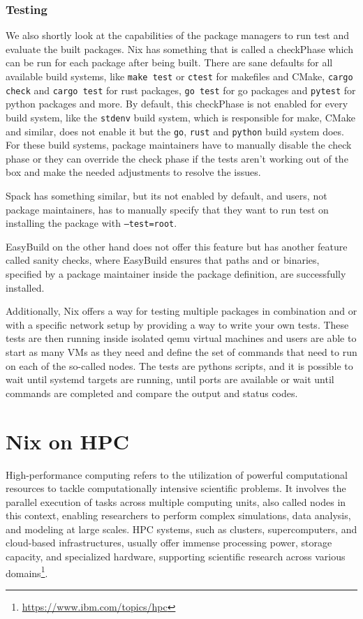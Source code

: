 \documentclass[conference,final,a4paper]{IEEEtran}
\begin{document}
\subsubsection{Testing}

We also shortly look at the capabilities of the package managers to run test and evaluate the built packages.
Nix has something that is called a checkPhase which can be run for each package after being built.
There are sane defaults for all available build systems, like \texttt{make test} or \texttt{ctest} for makefiles and CMake, \texttt{cargo check} and \texttt{cargo test} for rust packages, \texttt{go test} for go packages and \texttt{pytest} for python packages and more.
By default, this checkPhase is not enabled for every build system, like the \texttt{stdenv} build system, which is responsible for make, CMake and similar, does not enable it but the \texttt{go}, \texttt{rust} and \texttt{python} build system does.
For these build systems, package maintainers have to manually disable the check phase or they can override the check phase if the tests aren't working out of the box and make the needed adjustments to resolve the issues.

Spack has something similar, but its not enabled by default, and users, not package maintainers, has to manually specify that they want to run test on installing the package with \texttt{--test=root}.

EasyBuild on the other hand does not offer this feature but has another feature called sanity checks, where EasyBuild ensures that paths and or binaries, specified by a package maintainer inside the package definition, are successfully installed.

Additionally, Nix offers a way for testing multiple packages in combination and or with a specific network setup by providing a way to write your own tests.
These tests are then running inside isolated qemu virtual machines and users are able to start as many VMs as they need and define the set of commands that need to run on each of the so-called nodes.
The tests are pythons scripts, and it is possible to wait until systemd targets are running, until ports are available or wait until commands are completed and compare the output and status codes.

\section{Nix on HPC}\label{sec:nix-on-hpc}

High-performance computing refers to the utilization of powerful computational resources to tackle computationally intensive scientific problems.
It involves the parallel execution of tasks across multiple computing units, also called nodes in this context, enabling researchers to perform complex simulations, data analysis, and modeling at large scales.
HPC systems, such as clusters, supercomputers, and cloud-based infrastructures, usually offer immense processing power, storage capacity, and specialized hardware, supporting scientific research across various domains\footnote{\url{https://www.ibm.com/topics/hpc}}.
\end{document}
